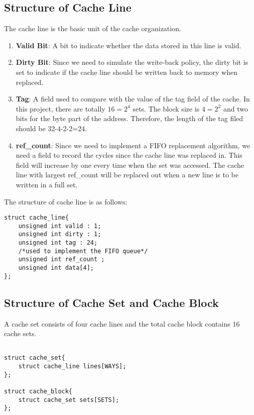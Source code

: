 \documentclass[paper=a4, fontsize=11pt]{scrartcl} %
\numberwithin{equation}{section} %
\numberwithin{figure}{section} %
\numberwithin{table}{section} %
\begin{document}
\subsection{Structure of Cache Line}
The cache line is the basic unit of the cache organization.
\begin{enumerate}
\item \textbf{Valid Bit}: A bit to indicate whether the data stored in this line is valid.
\item \textbf{Dirty Bit}: Since we need to simulate the write-back policy, the dirty bit is set to indicate if the cache line should be written back to memory when replaced.
\item \textbf{Tag}: A field used to compare with the value of the tag field of the cache. In this project, there are totally $16=2^{4}$ sets. The block size is $4=2^{2}$ and two bits for the byte part of the address. Therefore, the length of the tag filed should be 32-4-2-2=24.
\item \textbf{ref\_count}: Since we need to implement a FIFO replacement algorithm, we need a field to record the cycles since the cache line was replaced in. This field will increase by one every time when the set was accessed. The cache line with largest ref\_count will be replaced out when a new line is to be written in a full set.
\end{enumerate}
The structure of cache line is as follows:
\begin{lstlisting}[caption=structure of cache line,label=cache line,style=C]
struct cache_line{
	unsigned int valid : 1;
	unsigned int dirty : 1;
	unsigned int tag : 24;
	/*used to implement the FIFO queue*/
	unsigned int ref_count ;
	unsigned int data[4];
};
\end{lstlisting}

\subsection{Structure of Cache Set and Cache Block}
A cache set consists of four cache lines and the total cache block contains 16 cache sets.
\begin{lstlisting}[caption=structure of cache sets and blocks,label=cache set&block,style=C]

struct cache_set{
	struct cache_line lines[WAYS];
};

struct cache_block{
	struct cache_set sets[SETS];
};

\end{lstlisting}
\end{document}
